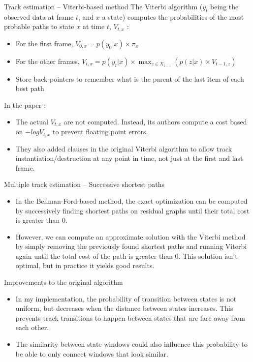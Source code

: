 \documentclass[final]{beamer}
\begin{document}
  \begin{frame}
    \begin{block}{\huge Track estimation -- Viterbi-based method}
      \LARGE
      The Viterbi algorithm ($y_t$ being the observed data at frame $t$, and $x$ a state) computes the probabilities of the most probable paths to state $x$ at time $t$, $V_{t,x}$ :
      \begin{itemize}
        \item For the first frame, $V_{0,x} = p\left(y_0|x \right) \times \pi_x$
        \item For the other frames, $V_{t,x} = p\left(y_t|x \right) \times \max_{z \in X_{t-1}} \left( p\left( z|x \right) \times V_{t-1,z} \right)$
        \item Store back-pointers to remember what is the parent of the last item of each best path
      \end{itemize}
      \vskip5mm

      In the paper :
      \begin{itemize}
        \item The actual $V_{t,x}$ are not computed. Instead, its authors compute a cost based on $-log V_{t,x}$ to prevent floating point errors.
        \item They also added clauses in the original Viterbi algorithm to allow track instantiation/destruction at any point in time, not just at the first and last frame.
      \end{itemize}
    \end{block}
  \end{frame}
  \begin{frame}
    \begin{block}{\huge Multiple track estimation -- Successive shortest paths}
      \LARGE
      \begin{itemize}
        \item In the Bellman-Ford-based method, the exact optimization can be computed by successively finding shortest paths on residual graphs until their total cost is greater than 0.
        \item However, we can compute an approximate solution with the Viterbi method by simply removing the previously found shortest paths and running Viterbi again until the total cost of the path is greater than 0. This solution isn't optimal, but in practice it yields good results.
      \end{itemize}
    \end{block}
    \begin{block}{\huge Improvements to the original algorithm}
      \LARGE
      \begin{itemize}
        \item In my implementation, the probability of transition between states is not uniform, but decreases when the distance between states increases. This prevents track transitions to happen between states that are fare away from each other.
        \item The similarity between state windows could also influence this probability to be able to only connect windows that look similar.
      \end{itemize}
    \end{block}
  \end{frame}
\end{document}
